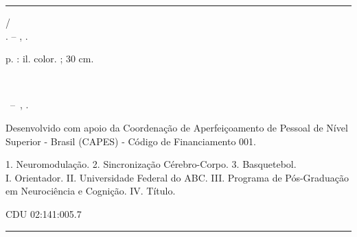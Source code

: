 %
%     
%

\begin{fichacatalografica}
    \vspace*{\fill}
    \hrule
    \begin{center}
    \begin{minipage}[c]{12cm}

    \imprimirautor

    \hspace{0.5cm} \imprimirtitulo /\\
    \hspace{0.5cm} \imprimirautor. -- \imprimirlocal, \imprimirdata.

    \hspace{0.5cm} \pageref{LastPage} p. : il. color. ; 30 cm.

    \hspace{0.5cm} \imprimirorientadorRotulo~\imprimirorientador

    \hspace{0.5cm}
    \parbox[t]{0.9\textwidth}{%
      \imprimirtipotrabalho~--~\imprimirinstituicao,
      \imprimirdata.
    }

    \hspace{0.5cm} Desenvolvido com apoio da Coordenação de Aperfeiçoamento de Pessoal de Nível Superior - Brasil (CAPES) - Código de Financiamento 001.

    \hspace{0.5cm}
    1. Neuromodulação. 2. Sincronização Cérebro-Corpo. 3. Basquetebol.\\
    I. Orientador. II. Universidade Federal do ABC. III. Programa de Pós-Graduação em Neurociência e Cognição. IV. Título.

    \hspace{8.75cm} CDU 02:141:005.7

    \end{minipage}
    \end{center}
    \hrule
\end{fichacatalografica}